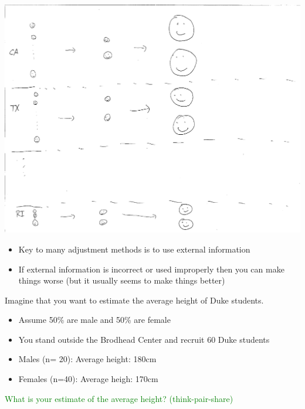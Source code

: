 \documentclass[aspectratio=169]{beamer}
\begin{document}
\begin{frame}

\begin{center}
\includegraphics[height=\textheight]{figures/stratified_sampling_cps}
\end{center}

\end{frame}
\begin{frame}

\begin{itemize}
\item Key to many adjustment methods is to use external information
\pause
\item If external information is incorrect or used improperly then you can make things worse (but it usually seems to make things better)
\end{itemize}

\end{frame}
\begin{frame}

Imagine that you want to estimate the average height of Duke students.\\
\begin{itemize}
\item Assume 50\% are male and 50\% are female
\item You stand outside the Brodhead Center and recruit 60 Duke students
\item Males (n= 20): Average height: 180cm
\item Females (n=40): Average heigh: 170cm
\end{itemize}
\textcolor{green}{What is your estimate of the average height? (think-pair-share)}

\end{frame}
\end{document}
